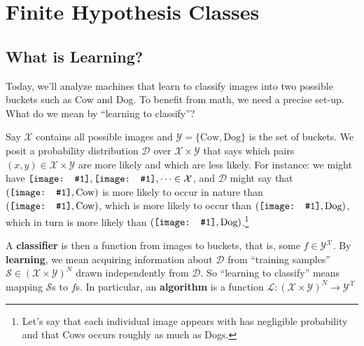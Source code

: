 \documentclass{article}
\newcommand{\Dd}{\mathcal{D}}
\newcommand{\Ll}{\mathcal{L}}
\newcommand{\Ss}{\mathcal{S}}
\newcommand{\Xx}{\mathcal{X}}
\newcommand{\Yy}{\mathcal{Y}}
\newcommand{\sdia}[1]{
\begingroup
\setbox0=\hbox{\texttt{[image: \#1]}}%
\parbox{\wd0}{\box0}\endgroup
}
\begin{document}
    \section{Finite Hypothesis Classes}
        \subsection{What is Learning?}
            Today, we'll analyze machines that learn to classify images into
            two possible buckets such as Cow and Dog.
            To benefit from math, we need a precise set-up.  What do we mean
            by ``learning to classify''?

            Say $\Xx$ contains all possible images and
            $\Yy=\{\text{Cow},\text{Dog}\}$ is the set of buckets.  We posit a
            probability distribution $\Dd$ over $\Xx \times \Yy$ that says
            which pairs $(x,y)\in \Xx\times \Yy$ are more likely and which are
            less likely.  For instance: we might have $\sdia{cow-a},
            \sdia{cow-d},\cdots \in \Xx$, and $\Dd$ might say that
            $(\sdia{cow-a}, \text{Cow})$ is more likely to occur in nature than 
            $(\sdia{cow-d}, \text{Cow})$, which is more likely to occur than
            $(\sdia{cow-d}, \text{Dog})$, which in turn is more likely than
            $(\sdia{cow-a}, \text{Dog})$.\footnote{
                Let's say that each individual image
                appears with has negligible probability and that Cows occurs
                roughly as much as Dogs.
            }

            A \textbf{classifier} is then a function from images to
            buckets, that is, some $f\in \Yy^{\Xx}$.  By \textbf{learning}, we
            mean acquiring information about $\Dd$ from ``training samples''
            $\Ss \in (\Xx\times\Yy)^N$ drawn independently from $\Dd$.  So
            ``learning to classify'' means mapping $\Ss$s to $f$s.  In
            particular, an \textbf{algorithm} is a function
            $\Ll:(\Xx\times\Yy)^N\to \Yy^{\Xx}$  

\end{document}
